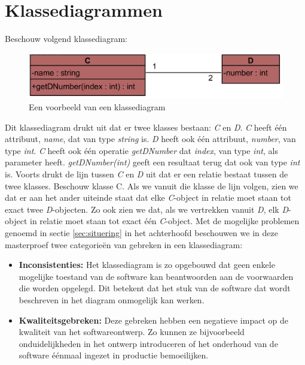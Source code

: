 \section{Klassediagrammen}

Beschouw volgend klassediagram:

\begin{figure}[H]
	\label{fig:cd}
	\centering
	\includegraphics{intro/cd.png}
	\caption{Een voorbeeld van een klassediagram}
\end{figure}

Dit klassediagram drukt uit dat er twee klasses bestaan: \textit{C} en \textit{D}. \textit{C} heeft \'e\'en attribuut, \textit{name}, dat van type \textit{string} is. \textit{D} heeft ook \'e\'en attribuut, \textit{number}, van type \textit{int}. \textit{C} heeft ook \'e\'en operatie \textit{getDNumber} dat \textit{index}, van type \textit{int}, als parameter heeft. \textit{getDNumber(int)} geeft een resultaat terug dat ook van type \textit{int} is. Voorts drukt de lijn tussen \textit{C} en \textit{D} uit dat er een relatie bestaat tussen de twee klasses. Beschouw klasse C. Als we vanuit die klasse de lijn volgen, zien we dat er aan het ander uiteinde staat dat elke \textit{C}-object in relatie moet staan tot exact twee \textit{D}-objecten. Zo ook zien we dat, als we vertrekken vanuit \textit{D}, elk \textit{D}-object in relatie moet staan tot exact \'e\'en \textit{C}-object.
Met de mogelijke problemen genoemd in sectie \ref{sec:situering} in het achterhoofd beschouwen we in deze masterproef twee categorie\"en van gebreken in een klassediagram:

\begin{itemize}
	\item \textbf{Inconsistenties:} Het klassediagram is zo opgebouwd dat geen enkele mogelijke toestand van de software kan beantwoorden aan de voorwaarden die worden opgelegd. Dit betekent dat het stuk van de software dat wordt beschreven in het diagram onmogelijk kan werken.
	\item \textbf{Kwaliteitsgebreken:} Deze gebreken hebben een negatieve impact op de kwaliteit van het softwareontwerp. Zo kunnen ze bijvoorbeeld onduidelijkheden in het ontwerp introduceren of het onderhoud van de software \'e\'enmaal ingezet in productie bemoeilijken.
\end{itemize}

